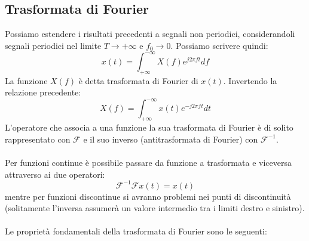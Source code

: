 \documentclass{article}
\begin{document}
\subsection{Trasformata di Fourier}
Possiamo estendere i risultati precedenti a segnali non periodici, considerandoli segnali periodici nel limite $T\rightarrow+\infty$ e $f_0\rightarrow0$. Possiamo scrivere quindi:
$$ x(t) = \int_{+\infty}^{-\infty}X(f)e^{j2\pi ft}df $$
La funzione $X(f)$ è detta trasformata di Fourier di $x(t)$. Invertendo la relazione precedente:
$$ X(f)=\int_{+\infty}^{-\infty}x(t)e^{-j2\pi ft}dt $$
L'operatore che associa a una funzione la sua trasformata di Fourier è di solito rappresentato con $\mathcal{F} $ e il suo inverso (antitrasformata di Fourier) con $\mathcal{F}^{-1}$.\\\\
Per funzioni continue è possibile passare da funzione a trasformata e viceversa attraverso ai due operatori:
$$ \mathcal{F}^{-1}\mathcal{F}x(t) = x(t) $$
mentre per funzioni discontinue si avranno problemi nei punti di discontinuità (solitamente l'inversa assumerà un valore intermedio tra i limiti destro e sinistro).\\\\
Le proprietà fondamentali della trasformata di Fourier sono le seguenti:
\end{document}
